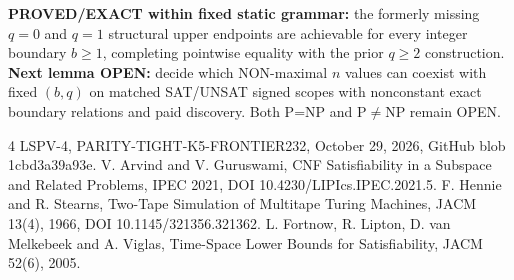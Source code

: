 \documentclass[11pt]{article}
\begin{document}
\noindent\textbf{PROVED/EXACT within fixed static grammar:} the formerly missing $q=0$ and $q=1$ structural upper endpoints are achievable for every integer boundary $b\ge1$, completing pointwise equality with the prior $q\ge2$ construction. \textbf{Next lemma OPEN:} decide which NON-maximal $n$ values can coexist with fixed $(b,q)$ on matched SAT/UNSAT signed scopes with nonconstant exact boundary relations and paid discovery. Both P=NP and P$\ne$NP remain OPEN.

\begin{thebibliography}{4}
 LSPV-4, PARITY-TIGHT-K5-FRONTIER232, October 29, 2026, GitHub blob 1cbd3a39a93e.
 V. Arvind and V. Guruswami, CNF Satisfiability in a Subspace and Related Problems, IPEC 2021, DOI 10.4230/LIPIcs.IPEC.2021.5.
 F. Hennie and R. Stearns, Two-Tape Simulation of Multitape Turing Machines, JACM 13(4), 1966, DOI 10.1145/321356.321362.
 L. Fortnow, R. Lipton, D. van Melkebeek and A. Viglas, Time-Space Lower Bounds for Satisfiability, JACM 52(6), 2005.
\end{thebibliography}
\end{document}
